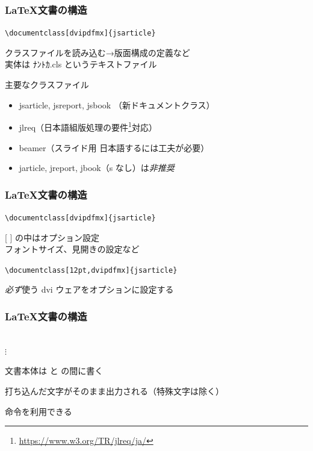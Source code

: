 \begin{frame}[fragile]
	\frametitle{\LaTeX 文書の構造}
	\begin{center}
		\verb+\documentclass[dvipdfmx]{jsarticle}+
	\end{center}
	
	クラスファイルを読み込む→版面構成の定義など\\
	{\footnotesize 実体は ﾅﾝﾄｶ.cls というテキストファイル}
	
	\begin{block}{主要なクラスファイル}
		\begin{itemize}
			\footnotesize
			\item jsarticle, jsreport, jsbook （新ドキュメントクラス）\\
			\item jlreq（日本語組版処理の要件\footnote{\url{https://www.w3.org/TR/jlreq/ja/}}対応）\\
			\item beamer（スライド用 日本語するには工夫が必要）
			\item jarticle, jreport, jbook（s なし）は\emph{非推奨}
		\end{itemize}
	\end{block}
\end{frame}

\begin{frame}[fragile]
	\frametitle{\LaTeX 文書の構造}
	\begin{center}
		\verb+\documentclass[dvipdfmx]{jsarticle}+
	\end{center}
	
	[ ] の中はオプション設定\\
	\bgroup\footnotesize フォントサイズ、見開きの設定など
	\begin{center}
		\verb+\documentclass[12pt,dvipdfmx]{jsarticle}+
	\end{center}
	\egroup
	
	\emph{必ず}使う dvi ウェアをオプションに設定する
\end{frame}

\begin{frame}[fragile]
	\frametitle{\LaTeX 文書の構造}
	\begin{center}
		\verb++\\
		$\vdots$\\
		\verb++
	\end{center}
	
	文書本体は \verb++ と \verb++ の間に書く
	
	打ち込んだ文字がそのまま出力される（特殊文字は除く）
	
	命令を利用できる
\end{frame}

